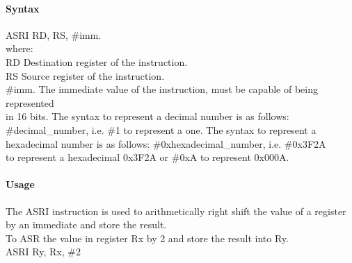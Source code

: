 \documentclass[12pt]{article}
\begin{document}
    \paragraph{Syntax}
    \begin{flushleft}
    ASRI RD, RS, \#imm.\\
    \vspace{1em}        %
    where:\\
    \vspace{1em}
    RD  \hspace{3.6em} Destination register of the instruction.\\
    \vspace{1em}
    RS  \hspace{3.85em} Source register of the instruction.\\
    \vspace{1em}
    \#imm.  \hspace{1.8em} The immediate value of the instruction, must be capable of being represented\\             \hspace{5.4em} in 16 bits. The syntax to represent a decimal number is as follows:\\
            \hspace{5.4em} \#decimal\_number, i.e. \#1 to represent a one. The syntax to represent a\\
            \hspace{5.4em} hexadecimal number is as follows: \#0xhexadecimal\_number, i.e. \#0x3F2A \\
            \hspace{5.4em} to represent a hexadecimal 0x3F2A or \#0xA to represent 0x000A.\\
    \end{flushleft}
    
    \paragraph{Usage}
    \begin{flushleft}
    The ASRI instruction is used to arithmetically right shift the value of a register by an immediate and store the result.\\ 
    \vspace{1em}
    To ASR the value in register Rx by 2 and store the result into Ry.\\
    \vspace{1em}
    ASRI Ry, Rx, \#2
    \end{flushleft}
    
\end{document}
